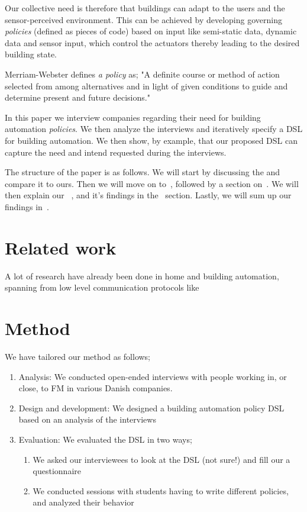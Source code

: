 \documentclass{llncs}
\begin{document}
Our collective need is therefore that buildings can adapt to the users and the sensor-perceived environment. This can be achieved by developing governing \textit{policies} (defined as pieces of code) based on input like semi-static data, dynamic data and sensor input, which control the actuators thereby leading to the desired building state.

Merriam-Webster defines \textit{a policy} as; "A definite course or method of action selected from among alternatives and in light of given conditions to guide and determine present and future decisions."

In this paper we interview companies regarding their need for building automation \textit{policies}. We then analyze the interviews and iteratively specify a DSL for building automation. We then show, by example, that our proposed DSL can capture the need and intend requested during the interviews.

The structure of the paper is as follows. We will start by discussing the and compare it to ours. Then we will move on to~, followed by a section on~. We will then explain our~ , and it's findings in the~ section. Lastly, we will sum up our findings in~.

\section{Related work}\label{sec:relatedwork}
A lot of research have already been done in home and building automation, spanning from low level communication protocols like 

\section{Method}\label{sec:method}
We have tailored our method as follows;

\begin{enumerate}
	\item Analysis: We conducted open-ended interviews with people working in, or close, to FM in various Danish companies.
	\item Design and development: We designed a building automation policy DSL based on an analysis of the interviews
	\item Evaluation: We evaluated the DSL in two ways;
	\begin{enumerate}
		\item We asked our interviewees to look at the DSL (not sure!) and fill our a questionnaire
		\item We conducted sessions with students having to write different policies, and analyzed their behavior
	\end{enumerate}
\end{enumerate}
\end{document}

